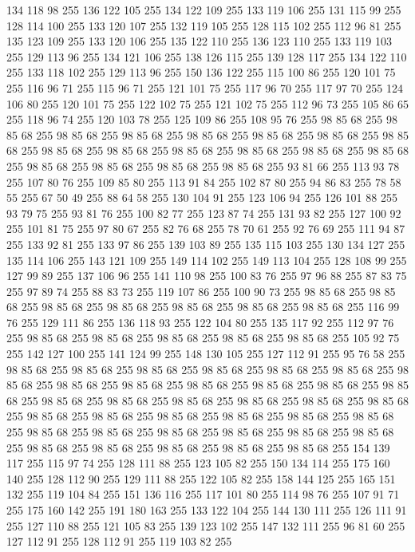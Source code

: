 134 118 98 255 136 122 105 255 134 122 109 255 133 119 106 255 131 115 99 255 128 114 100 255 133 120 107 255 132 119 105 255 128 115 102 255 112 96 81 255 135 123 109 255 133 120 106 255 135 122 110 255 136 123 110 255 133 119 103 255 129 113 96 255 134 121 106 255 138 126 115 255 139 128 117 255 134 122 110 255 133 118 102 255 129 113 96 255 150 136 122 255 115 100 86 255 120 101 75 255 116 96 71 255 115 96 71 255 121 101 75 255 117 96 70 255 117 97 70 255 124 106 80 255 120 101 75 255 122 102 75 255 121 102 75 255 112 96 73 255 105 86 65 255 118 96 74 255 120 103 78 255 125 109 86 255 108 95 76 255 98 85 68 255 98 85 68 255 98 85 68 255 98 85 68 255 98 85 68 255 98 85 68 255 98 85 68 255 98 85 68 255 98 85 68 255 98 85 68 255 98 85 68 255 98 85 68 255 98 85 68 255 98 85 68 255 98 85 68 255 98 85 68 255 98 85 68 255 98 85 68 255 93 81 66 255 113 93 78 255 107 80 76 255 109 85 80 255 113 91 84 255 102 87 80 255
94 86 83 255 78 58 55 255 67 50 49 255 88 64 58 255 130 104 91 255 123 106 94 255 126 101 88 255 93 79 75 255 93 81 76 255 100 82 77 255 123 87 74 255 131 93 82 255 127 100 92 255 101 81 75 255 97 80 67 255 82 76 68 255 78 70 61 255 92 76 69 255 111 94 87 255 133 92 81 255 133 97 86 255 139 103 89 255 135 115 103 255 130 134 127 255 135 114 106 255 143 121 109 255 149 114 102 255 149 113 104 255 128 108 99 255 127 99 89 255 137 106 96 255 141 110 98 255 100 83 76 255 97 96 88 255 87 83 75 255 97 89 74 255 88 83 73 255 119 107 86 255 100 90 73 255 98 85 68 255 98 85 68 255 98 85 68 255 98 85 68 255 98 85 68 255 98 85 68 255 98 85 68 255 116 99 76 255 129 111 86 255 136 118 93 255 122 104 80 255 135 117 92 255 112 97 76 255 98 85 68 255 98 85 68 255 98 85 68 255 98 85 68 255 98 85 68 255 105 92 75 255 142 127 100 255 141 124 99 255 148 130 105 255 127 112 91 255 95 76 58 255 98 85 68 255
98 85 68 255 98 85 68 255 98 85 68 255 98 85 68 255 98 85 68 255 98 85 68 255 98 85 68 255 98 85 68 255 98 85 68 255 98 85 68 255 98 85 68 255 98 85 68 255 98 85 68 255 98 85 68 255 98 85 68 255 98 85 68 255 98 85 68 255 98 85 68 255 98 85 68 255 98 85 68 255 98 85 68 255 98 85 68 255 98 85 68 255 98 85 68 255 98 85 68 255 98 85 68 255 98 85 68 255 98 85 68 255 98 85 68 255 98 85 68 255 98 85 68 255 98 85 68 255 98 85 68 255 98 85 68 255 98 85 68 255 154 139 117 255 115 97 74 255 128 111 88 255 123 105 82 255 150 134 114 255 175 160 140 255 128 112 90 255 129 111 88 255 122 105 82 255 158 144 125 255 165 151 132 255 119 104 84 255 151 136 116 255 117 101 80 255 114 98 76 255 107 91 71 255 175 160 142 255 191 180 163 255 133 122 104 255 144 130 111 255 126 111 91 255 127 110 88 255 121 105 83 255 139 123 102 255 147 132 111 255 96 81 60 255 127 112 91 255 128 112 91 255 119 103 82 255
